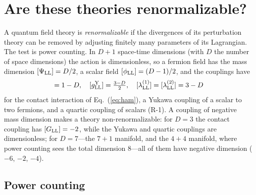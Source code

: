 \section{Are these theories renormalizable?}
\label{sec:renorm}

A quantum field theory is \emph{renormalizable} if the divergences of its perturbation theory can be
removed by adjusting finitely many parameters of its Lagrangian. The test is power counting. In
$D+1$ space-time dimensions (with $D$ the number of space dimensions) the action is dimensionless, so a
fermion field has the mass dimension $[\Psi_{\rm LL}]=D/2$, a scalar field $[\phi_{\rm LL}]=(D-1)/2$, and
the couplings have
\begin{equation}
[G_{\rm LL}]=1-D,\quad [g^{\rm Y}_{\rm LL}]=\tfrac{3-D}2,\quad [\lambda^{(1)}_{\rm LL}]=[\lambda^{(2)}_{\rm LL}]=3-D
\label{eq:dims}
\end{equation}
for the contact interaction of Eq.~(\ref{eq:ham}), a Yukawa coupling of a scalar to two fermions, and a
quartic coupling of scalars (R-1). A coupling of negative mass dimension makes a theory
non-renormalizable: for $D=3$ the contact coupling has $[G_{\rm LL}]=-2$, while the Yukawa and quartic
couplings are dimensionless; for $D=7$---the $7+1$ manifold, and the $4+4$ manifold, where power
counting sees the total dimension 8---all of them have negative dimension ($-6$, $-2$, $-4$).

\subsection{Power counting}


